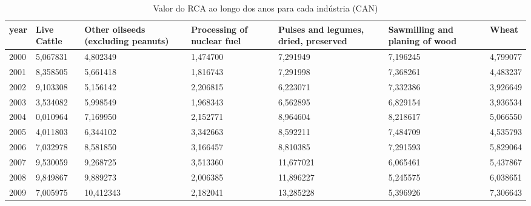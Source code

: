 \begin{table}
\centering
\caption{Valor do RCA ao longo dos anos para cada indústria (CAN)}
\begin{tabular}{p{1cm}p{2cm}p{2cm}p{2cm}p{2cm}p{2cm}p{2cm}}
\toprule
 year &  Live Cattle &  Other oilseeds (excluding peanuts) &  Processing of nuclear fuel &  Pulses and legumes, dried, preserved &  Sawmilling and planing of wood &    Wheat \\
\midrule
 2000 &     5,067831 &                            4,802349 &                    1,474700 &                              7,291949 &                        7,196245 & 4,799077 \\
 2001 &     8,358505 &                            5,661418 &                    1,816743 &                              7,291998 &                        7,368261 & 4,483237 \\
 2002 &     9,103308 &                            5,156142 &                    2,206815 &                              6,223071 &                        7,332386 & 3,926649 \\
 2003 &     3,534082 &                            5,998549 &                    1,968343 &                              6,562895 &                        6,829154 & 3,936534 \\
 2004 &     0,010964 &                            7,169950 &                    2,152771 &                              8,964604 &                        8,218617 & 5,066550 \\
 2005 &     4,011803 &                            6,344102 &                    3,342663 &                              8,592211 &                        7,484709 & 4,535793 \\
 2006 &     7,032978 &                            8,581850 &                    3,166457 &                              8,810385 &                        7,291593 & 5,829064 \\
 2007 &     9,530059 &                            9,268725 &                    3,513360 &                             11,677021 &                        6,065461 & 5,437867 \\
 2008 &     9,849867 &                            9,889273 &                    2,006385 &                             11,896227 &                        5,245575 & 6,038651 \\
 2009 &     7,005975 &                           10,412343 &                    2,182041 &                             13,285228 &                        5,396926 & 7,306643 \\

\end{tabular}
\end{table}
